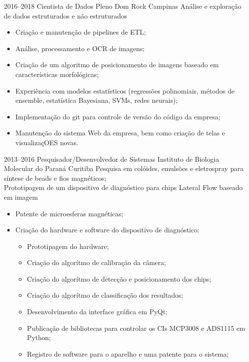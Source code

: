 \documentclass[11pt,a4paper,sans]{moderncv}        %
\begin{document}
\vspace{1em}
\cventry
{2016--2018}
{Cientista de Dados Pleno}
{Dom Rock}
{Campinas}{}
{Análise e exploração de dados estruturados e não estruturados}
\begin{itemize}%
	\item Criação e manutenção de pipelines de ETL;
	\item Análise, processamento e OCR de imagens;
	\item Criação de um algoritmo de posicionamento de imagens baseado em características morfológicas;
	\item Experiência com modelos estatísticos (regressões polinomiais, métodos de ensemble, estatística Bayesiana, SVMs, redes neurais);
	\item Implementação do git para controle de versão do código da empresa;
	\item Manutenção do sistema Web da empresa, bem como criação de telas e visualizaçOES novas.
\end{itemize}

\vspace{1em}
\cventry
{2013--2016}
{Pesquisador/Desenvolvedor de Sistemas}
{Instituto de Biologia Molecular do Paraná}
{Curitiba}{}
{Pesquisa em colóides, emulsões e eletrospray para síntese de beads e fios magnéticos;\\
	Prototipagem de um dispositivo de diagnóstico para chips Lateral Flow baseado em imagem}
\begin{itemize}%
	\item Patente de microesferas magnéticas;
	\item Criação do hardware e software do dispositivo de diagnóstico:
	      \begin{itemize}%
		      \item Prototipagem do hardware;
		      \item Criação do algorítmo de calibração da câmera;
		      \item Criação do algorítmo de detecção e posicionamento dos chips;
		      \item Criação do algorítmo de classificação dos resultados;
		      \item Desenvolvimento da interface gráfica em PyQt;
		      \item Publicação de bibliotecas para controlar os CIs MCP3008 e ADS1115 em Python;
		      \item Registro de software para o aparelho e uma patente para o sistema;
	      \end{itemize}
\end{itemize}
\end{document}
